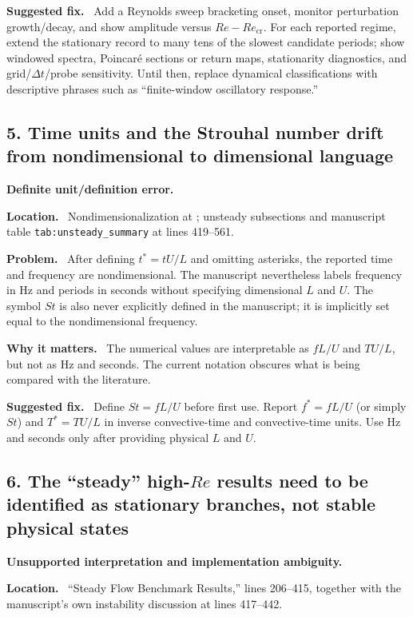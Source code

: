 \documentclass[11pt,a4paper]{article}
\newcommand{\classify}[1]{\textcolor{blue!65!black}{\textbf{#1}}}
\newcommand{\field}[1]{\par\noindent\textbf{#1}\ }
\begin{document}
\field{Suggested fix.} Add a Reynolds sweep bracketing onset, monitor perturbation growth/decay, and show amplitude versus $Re-Re_{\mathrm{cr}}$. For each reported regime, extend the stationary record to many tens of the slowest candidate periods; show windowed spectra, Poincar\'e sections or return maps, stationarity diagnostics, and grid/$\Delta t$/probe sensitivity. Until then, replace dynamical classifications with descriptive phrases such as ``finite-window oscillatory response.''

\subsection*{5. Time units and the Strouhal number drift from nondimensional to dimensional language}

\classify{Definite unit/definition error.}

\field{Location.} Nondimensionalization at ; unsteady subsections and manuscript table \texttt{tab:unsteady\_summary} at lines 419--561.

\field{Problem.} After defining $t^*=tU/L$ and omitting asterisks, the reported time and frequency are nondimensional. The manuscript nevertheless labels frequency in Hz and periods in seconds without specifying dimensional $L$ and $U$. The symbol $St$ is also never explicitly defined in the manuscript; it is implicitly set equal to the nondimensional frequency.

\field{Why it matters.} The numerical values are interpretable as $fL/U$ and $TU/L$, but not as Hz and seconds. The current notation obscures what is being compared with the literature.

\field{Suggested fix.} Define $St=fL/U$ before first use. Report $f^*=fL/U$ (or simply $St$) and $T^*=TU/L$ in inverse convective-time and convective-time units. Use Hz and seconds only after providing physical $L$ and $U$.

\subsection*{6. The ``steady'' high-$Re$ results need to be identified as stationary branches, not stable physical states}

\classify{Unsupported interpretation and implementation ambiguity.}

\field{Location.} ``Steady Flow Benchmark Results,'' lines 206--415, together with the manuscript's own instability discussion at lines 417--442.
\end{document}

